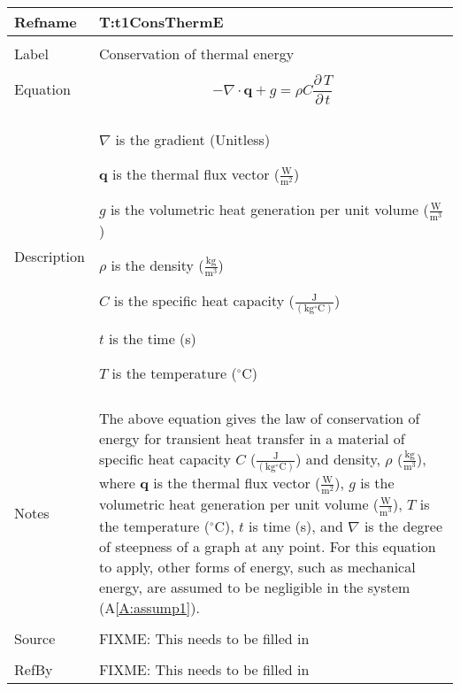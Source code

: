 \documentclass[12pt]{article}
\begin{document}
\noindent \begin{minipage}{\textwidth}
\begin{tabular}{p{} p{}}
\toprule \textbf{Refname} & \textbf{T:t1ConsThermE}
\label{T:t1ConsThermE}
\\ \midrule \\
Label & Conservation of thermal energy
\\ \midrule \\
Equation & \begin{dmath}
           -∇\cdot{}\mathbf{q}+g=ρ C \frac{\partial{}\,T}{\partial{}\,t}
           \end{dmath}
\\ \midrule \\
Description & \begin{symbDescription}
              \item{$∇$ is the gradient (Unitless)}
              \item{$\mathbf{q}$ is the thermal flux vector ($\frac{\text{W}}{\text{m}^{2}}$)}
              \item{$g$ is the volumetric heat generation per unit volume ($\frac{\text{W}}{\text{m}^{3}}$)}
              \item{$ρ$ is the density ($\frac{\text{kg}}{\text{m}^{3}}$)}
              \item{$C$ is the specific heat capacity ($\frac{\text{J}}{(\text{kg}{}^{\circ}\text{C})}$)}
              \item{$t$ is the time (s)}
              \item{$T$ is the temperature (${}^{\circ}$C)}
              \end{symbDescription}
\\ \midrule \\
Notes & The above equation gives the law of conservation of energy for transient heat transfer in a material of specific heat capacity $C$ ($\frac{\text{J}}{(\text{kg}{}^{\circ}\text{C})}$) and density, $ρ$ ($\frac{\text{kg}}{\text{m}^{3}}$), where $\mathbf{q}$ is the thermal flux vector ($\frac{\text{W}}{\text{m}^{2}}$), $g$ is the volumetric heat generation per unit volume ($\frac{\text{W}}{\text{m}^{3}}$), $T$ is the temperature (${}^{\circ}$C), $t$ is time (s), and $∇$ is the degree of steepness of a graph at any point. For this equation to apply, other forms of energy, such as mechanical energy, are assumed to be negligible in the system (A\ref{A:assump1}).
\\ \midrule \\
Source & FIXME: This needs to be filled in
\\ \midrule \\
RefBy & FIXME: This needs to be filled in
\\ \bottomrule \end{tabular}
\end{minipage}\\
\end{document}

